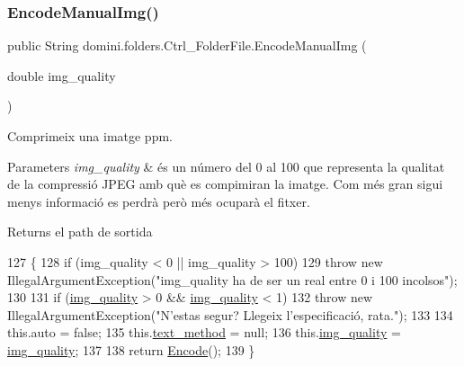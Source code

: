 \subsubsection{\texorpdfstring{Encode\+Manual\+Img()}{EncodeManualImg()}}
{\footnotesize\ttfamily public String domini.\+folders.\+Ctrl\+\_\+\+Folder\+File.\+Encode\+Manual\+Img (\begin{DoxyParamCaption}\item[{double}]{img\+\_\+quality }\end{DoxyParamCaption})\hspace{0.3cm}{\ttfamily [inline]}}



Comprimeix una imatge ppm. 


\begin{DoxyParams}{Parameters}
{\em img\+\_\+quality} & és un número del 0 al 100 que representa la qualitat de la compressió J\+P\+EG amb què es compimiran la imatge. Com més gran sigui menys informació es perdrà però més ocuparà el fitxer. \\
\hline
\end{DoxyParams}
\begin{DoxyReturn}{Returns}
el path de sortida 
\end{DoxyReturn}

\begin{DoxyCode}
127                                                       \{
128         \textcolor{keywordflow}{if} (img\_quality < 0 || img\_quality > 100)
129             \textcolor{keywordflow}{throw} \textcolor{keyword}{new} IllegalArgumentException(\textcolor{stringliteral}{"img\_quality ha de ser un real entre 0 i 100 incolsos"});
130 
131         \textcolor{keywordflow}{if} (\hyperlink{classdomini_1_1folders_1_1Ctrl__FolderFile_a7990a74c394d53a58ebbf4a7872c700d}{img\_quality} > 0 && \hyperlink{classdomini_1_1folders_1_1Ctrl__FolderFile_a7990a74c394d53a58ebbf4a7872c700d}{img\_quality} < 1)
132             \textcolor{keywordflow}{throw} \textcolor{keyword}{new} IllegalArgumentException(\textcolor{stringliteral}{"N'estas segur? Llegeix l'especificació, rata."});
133 
134         this.\textcolor{keyword}{auto} = \textcolor{keyword}{false};
135         this.\hyperlink{classdomini_1_1folders_1_1Ctrl__FolderFile_a75ef571be454360b835f552d2cf20741}{text\_method} = null;
136         this.\hyperlink{classdomini_1_1folders_1_1Ctrl__FolderFile_a7990a74c394d53a58ebbf4a7872c700d}{img\_quality} = \hyperlink{classdomini_1_1folders_1_1Ctrl__FolderFile_a7990a74c394d53a58ebbf4a7872c700d}{img\_quality};
137 
138         \textcolor{keywordflow}{return} \hyperlink{classdomini_1_1folders_1_1Ctrl__FolderFile_a7c47fd5127ae6f713a4fa7f75002a6f6}{Encode}();
139     \}
\end{DoxyCode}
\mbox{\label{classdomini_1_1folders_1_1Ctrl__FolderFile_a77b9d8244dd36e77516a9dc43ec50ed8}} 
